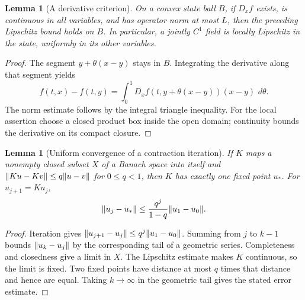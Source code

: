 \documentclass[11pt,oneside]{book}
\newtheorem{lemma}[theorem]{Lemma}
\theoremstyle{definition}
\theoremstyle{remark}\newtheorem{remark}[theorem]{Remark}
\newcommand{\dd}{\,d}\newcommand{\id}{\operatorname{id}}
\begin{document}
\begin{lemma}[A derivative criterion]\label{d13:03:derivative-bound}
On a convex state ball $B$, if $D_xf$ exists, is continuous in all
variables, and has operator norm at most $L$, then the preceding
Lipschitz bound holds on $B$. In particular, a jointly $C^1$ field is
locally Lipschitz in the state, uniformly in its other variables.
\end{lemma}
\begin{proof}
The segment $y+\theta(x-y)$ stays in $B$. Integrating the derivative along
that segment yields
\[
 f(t,x)-f(t,y)=\int_0^1D_xf(t,y+\theta(x-y))(x-y)\,\dd\theta.
\]
The norm estimate follows by the integral triangle inequality. For the
local assertion choose a closed product box inside the open domain;
continuity bounds the derivative on its compact closure.
\end{proof}

\begin{lemma}[Uniform convergence of a contraction iteration]\label{d13:03:contraction}
If $K$ maps a nonempty closed subset $X$ of a Banach space into itself
and $\lVert Ku-Kv\rVert\leq q\lVert u-v\rVert$ for $0\leq q<1$, then $K$ has
exactly one fixed point $u_*$. For $u_{j+1}=Ku_j$,
\[
 \lVert u_j-u_*\rVert\leq\frac{q^j}{1-q}\lVert u_1-u_0\rVert.
\]
\end{lemma}
\begin{proof}
Iteration gives $\lVert u_{j+1}-u_j\rVert\leq q^j\lVert u_1-u_0\rVert$.
Summing from $j$ to $k-1$ bounds $\lVert u_k-u_j\rVert$ by the corresponding
tail of a geometric series. Completeness and closedness give a limit in
$X$. The Lipschitz estimate makes $K$ continuous, so the limit is fixed.
Two fixed points have distance at most $q$ times that distance and hence
are equal. Taking $k\to\infty$ in the geometric tail gives the stated
error estimate.
\end{proof}
\end{document}
